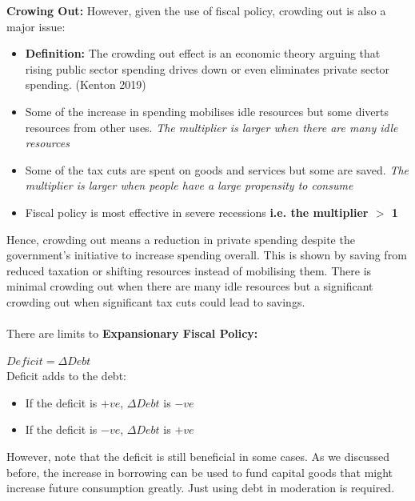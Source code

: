 \documentclass[12pt, letterpaper]{article}
\begin{document}
\begin{center}
\noindent{}
\end{center}
\textbf{Crowing Out:}
However, given the use of fiscal policy, crowding out is also a major issue:
\begin{itemize}
	\item \textbf{Definition:} The crowding out effect is an economic theory arguing that rising public sector spending drives down or even eliminates private sector spending. (Kenton 2019)
	\item Some of the increase in spending mobilises idle resources but some diverts resources from other uses. \textit{The multiplier is larger when there are many idle resources}
	\item Some of the tax cuts are spent on goods and services but some are saved. \textit{The multiplier is larger when people have a large propensity to consume}
	\item Fiscal policy is most effective in severe recessions \textbf{i.e. the multiplier $>$ 1}
\end{itemize}
Hence, crowding out means a reduction in private spending despite the government's initiative to increase spending overall. This is shown by saving from reduced taxation or shifting resources instead of mobilising them. There is minimal crowding out when there are many idle resources but a significant crowding out when significant tax cuts could lead to savings.\\\\
There are limits to \textbf{Expansionary Fiscal Policy:}
\begin{center}
	$Deficit = \Delta Debt$\\
	Deficit adds to the debt:
		\begin{itemize}
			\item If the deficit is $+ve$, $\Delta Debt$ is $-ve$
			\item If the deficit is $-ve$, $\Delta Debt$ is $+ve$
		\end{itemize}
\end{center}
However, note that the deficit is still beneficial in some cases. As we discussed before, the increase in borrowing can be used to fund capital goods that might increase future consumption greatly. Just using debt in moderation is required.
\end{document}
